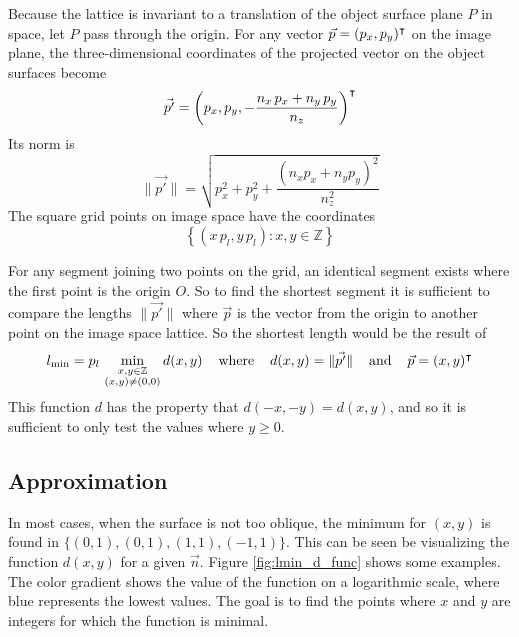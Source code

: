 Because the lattice is invariant to a translation of the object surface plane $P$ in space, let $P$ pass through the origin. For any vector $\vec{p} = (p_x, p_y)^\intercal$ on the image plane, the three-dimensional coordinates of the projected vector on the object surfaces become
\begin{equation}
\vec{p'} = \left( p_x, p_y, - \frac{n_x \, p_x + n_y \, p_y}{n_z}  \right)^\intercal
\end{equation}
Its norm is
\begin{equation}
\| \vec{p'} \| = \sqrt{p^2_x + p^2_y + \frac{(n_x p_x + n_y p_y)^2}{n^2_z}}
\end{equation}
The square grid points on image space have the coordinates
\begin{equation}
\left\{ (x \, p_l, y \, p_l) : x,y \in \mathbb{Z} \right\}
\end{equation}

For any segment joining two points on the grid, an identical segment exists where the first point is the origin $O$. So to find the shortest segment it is sufficient to compare the lengths $\| \vec{p'} \|$ where $\vec{p}$ is the vector from the origin to another point on the image space lattice. So the shortest length would be the result of
\begin{equation}
l_{\text{min}} = p_l \, \min_{\substack{x,y \in \mathbb{Z} \\ (x,y) \neq (0,0)}} d(x,y)
\hspace{4mm} \text{where} \hspace{4mm}
d(x,y) = \| \vec{p'} \|
\hspace{4mm} \text{and} \hspace{4mm}
\vec{p} = (x, y)^\intercal
\end{equation}
This function $d$ has the property that $d(-x,-y) = d(x,y)$, and so it is sufficient to only test the values where $y \geq 0$.

\subsection{Approximation}
In most cases, when the surface is not too oblique, the minimum for $(x, y)$ is found in $\{ (0, 1), (0, 1), (1, 1), (-1, 1) \}$. This can be seen be visualizing the function $d(x,y)$ for a given $\vec{n}$. Figure \ref{fig:lmin_d_func} shows some examples. The color gradient shows the value of the function on a logarithmic scale, where blue represents the lowest values. The goal is to find the points where $x$ and $y$ are integers for which the function is minimal.

